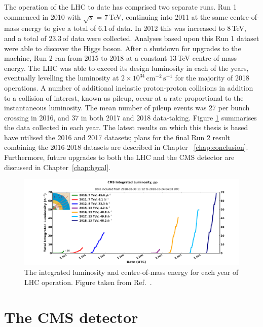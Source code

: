 The operation of the LHC to date has comprised two separate runs.
Run 1 commenced in 2010 with $\sqrt{s}$ = 7\,TeV, continuing into 2011 at the same centre-of-mass energy to give a total of 6.1\,\fb of data.
In 2012 this was increased to 8\,TeV, and a total of 23.3\,\fb of data were collected.
Analyses based upon this Run 1 dataset were able to discover the Higgs boson.
After a shutdown for upgrades to the machine, Run 2 ran from 2015 to 2018 at a constant 13\,TeV centre-of-mass energy.
The LHC was able to exceed its design luminosity in each of the years, eventually levelling the luminosity at $2\times10^{34}\,\textrm{cm}^{-2}\,\textrm{s}^{-1}$ for the majority of 2018 operations.
A number of additional inelastic proton-proton collisions in addition to a collision of interest, known as pileup, occur at a rate proportional to the instantaneous luminosity.
The mean number of pileup events was 27 per bunch crossing in 2016, and 37 in both 2017 and 2018 data-taking.
Figure \ref{fig:detector_Run1andRun2lumi} summarises the data collected in each year.
The latest \Hgg results on which this thesis is based have utilised the 2016 and 2017 datasets; 
plans for the final Run 2 result combining the 2016-2018 datasets are described in Chapter ~\ref{chap:conclusion}.
Furthermore, future upgrades to both the LHC and the CMS detector are discussed in Chapter~\ref{chap:hgcal}.

\begin{figure}[h!]
  \centering
  \includegraphics[width=\textwidth]{Figures/Detector/Run1andRun2lumi.pdf}
  \caption[LHC integrated luminosity and centre-of-mass energy per year.]
  {The integrated luminosity and centre-of-mass energy for each year of LHC operation.
  Figure taken from Ref.~\cite{CMSLumiPublic}.}
  \label{fig:detector_Run1andRun2lumi}
\end{figure}

\section{The CMS detector}

